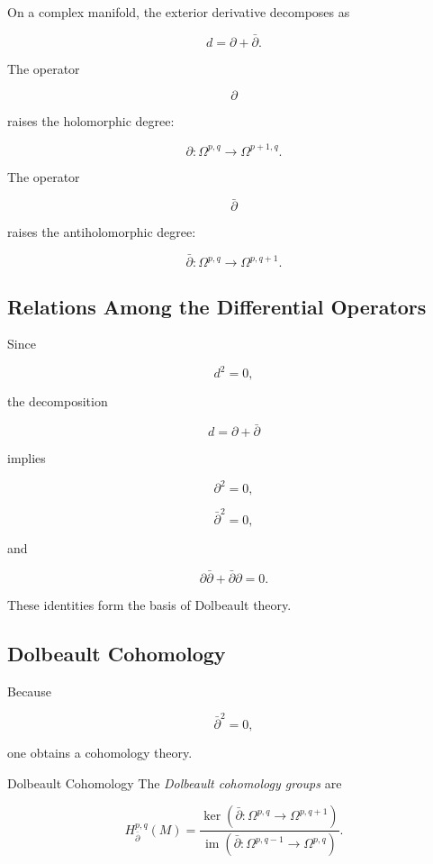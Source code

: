 On a complex manifold, the exterior derivative decomposes as

\[
\boxed{
d=\partial+\bar{\partial}.
}
\]

The operator

\[
\partial
\]

raises the holomorphic degree:

\[
\boxed{
\partial:
\Omega^{p,q}
\to
\Omega^{p+1,q}.
}
\]

The operator

\[
\bar{\partial}
\]

raises the antiholomorphic degree:

\[
\boxed{
\bar{\partial}:
\Omega^{p,q}
\to
\Omega^{p,q+1}.
}
\]

\subsection{Relations Among the Differential Operators}
\label{subsec:complex-differential-relations}

Since

\[
d^2=0,
\]

the decomposition

\[
d=\partial+\bar{\partial}
\]

implies

\[
\boxed{\partial^2=0,}
\]

\[
\boxed{\bar{\partial}^2=0,}
\]

and

\[
\boxed{
\partial\bar{\partial}
+
\bar{\partial}\partial
=
0.
}
\]

These identities form the basis of Dolbeault theory.

\subsection{Dolbeault Cohomology}
\label{subsec:dolbeault-cohomology}

Because

\[
\bar{\partial}^2=0,
\]

one obtains a cohomology theory.

\begin{definitionbox}{Dolbeault Cohomology}
The \emph{Dolbeault cohomology groups} are

\[
\boxed{
H_{\bar{\partial}}^{p,q}(M)
=
\frac{
\ker\left(
\bar{\partial}:\Omega^{p,q}\to\Omega^{p,q+1}
\right)
}{
\operatorname{im}\left(
\bar{\partial}:\Omega^{p,q-1}\to\Omega^{p,q}
\right)
}.
}
\]
\end{definitionbox}

